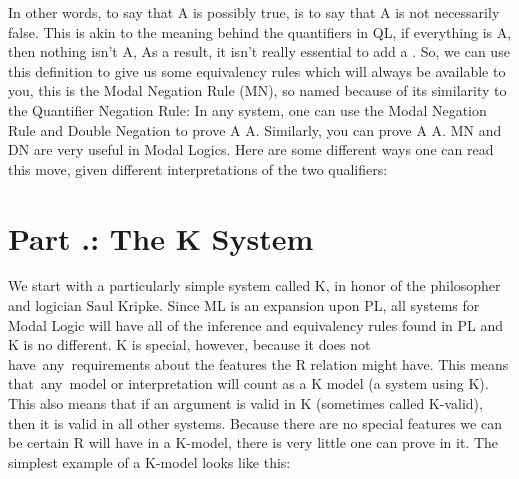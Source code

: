 In other words, to say that A is possibly true, is to say that A is not necessarily false. This is akin to the meaning behind the quantifiers in QL, if everything is A, then nothing isn't A, As a result, it isn’t really essential to add a \ediamond . So, we can use this definition to give us some equivalency rules which will always be available to you, this is the Modal Negation Rule (MN), so named because of its similarity to the Quantifier Negation Rule:
In any system, one can use the Modal Negation Rule and Double Negation to prove \ediamond A \eiff  \enot \ebox \enot A. Similarly, you can prove \ebox A \eiff  \enot \ediamond \enot A. MN and DN are very useful in Modal Logics. Here are some different ways one can read this move, given different interpretations of the two qualifiers:
\section{Part \thechapcount.\theseccount: The K System}
We start with a particularly simple system called \Gls{K}, in honor of the philosopher and logician Saul Kripke. Since ML is an expansion upon PL, all systems for Modal Logic will have all of the inference and equivalency rules found in PL and K is no different. K is special, however, because it does not have any requirements about the features the R relation might have. This means that any model or interpretation will count as a K model (a system using K). This also means that if an argument is valid in K (sometimes called K-valid), then it is valid in all other systems. Because there are no special features we can be certain R will have in a K-model, there is very little one can prove in it. The simplest example of a K-model looks like this:

